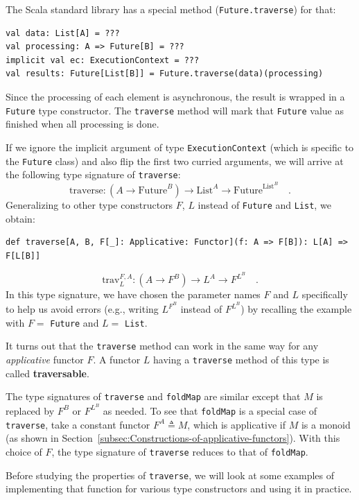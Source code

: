 The Scala standard library has a special method (\lstinline!Future.traverse!)
for that:
\begin{lstlisting}
val data: List[A] = ???
val processing: A => Future[B] = ???
implicit val ec: ExecutionContext = ???
val results: Future[List[B]] = Future.traverse(data)(processing)
\end{lstlisting}
Since the processing of each element is asynchronous, the result is
wrapped in a \lstinline!Future! type constructor. The \lstinline!traverse!
method will mark that \lstinline!Future! value as finished when all
processing is done.

If we ignore the implicit argument of type \lstinline!ExecutionContext!
(which is specific to the \lstinline!Future! class) and also flip
the first two curried arguments, we will arrive at the following type
signature of \lstinline!traverse!:
\[
\text{traverse}:(A\rightarrow\text{Future}^{B})\rightarrow\text{List}^{A}\rightarrow\text{Future}^{\text{List}^{B}}\quad.
\]
Generalizing to other type constructors $F$, $L$ instead of \lstinline!Future!
and \lstinline!List!, we obtain:
\begin{lstlisting}
def traverse[A, B, F[_]: Applicative: Functor](f: A => F[B]): L[A] => F[L[B]]
\end{lstlisting}
\[
\text{trav}_{L}^{F,A}:(A\rightarrow F^{B})\rightarrow L^{A}\rightarrow F^{L^{B}}\quad.
\]
In this type signature, we have chosen the parameter names $F$ and
$L$ specifically to help us avoid errors (e.g., writing $L^{F^{B}}$
instead of $F^{L^{B}}$) by recalling the example with $F=$ \lstinline!Future!
and $L=$ \lstinline!List!.

It turns out that the \lstinline!traverse! method can work in the
same way for any \emph{applicative} functor $F$. A functor $L$ having
a \lstinline!traverse! method of this type is called \textbf{traversable}.

The type signatures of \lstinline!traverse! and \lstinline!foldMap!
are similar except that $M$ is replaced by $F^{B}$ or $F^{L^{B}}$
as needed. To see that \lstinline!foldMap! is a special case of \lstinline!traverse!,
take a constant functor $F^{A}\triangleq M$, which is applicative
if $M$ is a monoid (as shown in Section~\ref{subsec:Constructions-of-applicative-functors}).
With this choice of $F$, the type signature of \lstinline!traverse!
reduces to that of \lstinline!foldMap!.

Before studying the properties of \lstinline!traverse!, we will look
at some examples of implementing that function for various type constructors
and using it in practice.

